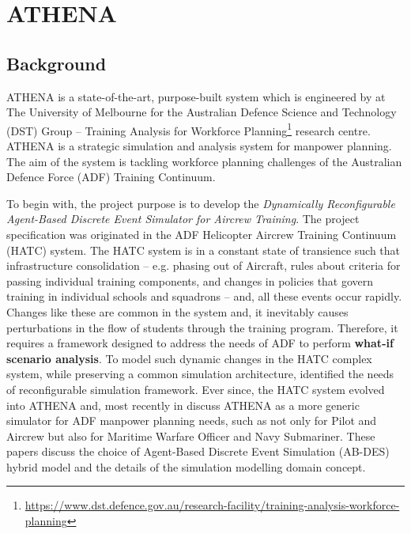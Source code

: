 \chapter{ATHENA} 

\label{Chapter2}

\section{Background}

ATHENA is a state-of-the-art, purpose-built system which is engineered by \textit{\groupname} at The University of Melbourne for the Australian Defence Science and Technology (DST) Group -- Training Analysis for Workforce Planning\footnote{\url{https://www.dst.defence.gov.au/research-facility/training-analysis-workforce-planning}} research centre. ATHENA is a strategic simulation and analysis system for manpower planning. The aim of the system is tackling workforce planning challenges of the Australian Defence Force (ADF) Training Continuum. 

To begin with, the project purpose is to develop the \textit{Dynamically Reconfigurable Agent-Based Discrete Event Simulator for Aircrew Training}. The project specification was originated in the ADF Helicopter Aircrew Training Continuum (HATC) system. The HATC\parencite{HATC} system is in a constant state of transience such that infrastructure consolidation -- e.g. phasing out of Aircraft, rules about criteria for passing individual training components, and changes in policies that govern training in individual schools and squadrons -- and, all these events occur rapidly. Changes like these are common in the system and, it inevitably causes perturbations in the flow of students through the training program. Therefore, it requires a framework designed to address the needs of ADF to perform \textbf{what-if scenario analysis}. To model such dynamic changes in the HATC complex system, while preserving a common simulation architecture, \parencite{HATC} identified the needs of reconfigurable simulation framework. Ever since, the HATC system evolved into ATHENA and, most recently in \parencite{8248116} discuss ATHENA as a more generic simulator for ADF manpower planning needs, such as not only for Pilot and Aircrew but also for Maritime Warfare Officer and Navy Submariner.
These papers discuss the choice of Agent-Based Discrete Event Simulation (AB-DES) hybrid model and the details of the simulation modelling domain concept.

